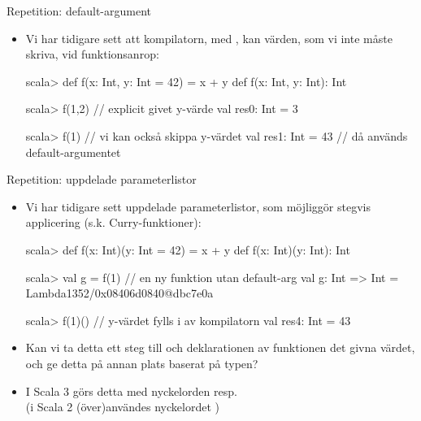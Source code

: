 \begin{Slide}{Repetition: default-argument}\SlideFontSmall
\begin{itemize}\SlideFontSmall
\item Vi har tidigare sett att kompilatorn, med , kan  värden, som vi inte måste skriva, vid funktionsanrop:
\begin{REPLnonum}
scala> def f(x: Int, y: Int = 42) = x + y
def f(x: Int, y: Int): Int

scala> f(1,2)        // explicit givet y-värde
val res0: Int = 3

scala> f(1)          // vi kan också skippa y-värdet  
val res1: Int = 43   // då används default-argumentet
\end{REPLnonum}
\end{itemize}
\end{Slide}


\begin{Slide}{Repetition: uppdelade parameterlistor}\SlideFontSmall
\begin{itemize}\SlideFontSmall
\item Vi har tidigare sett uppdelade parameterlistor, som möjliggör stegvis applicering (s.k. Curry-funktioner):
\begin{REPLsmall}
scala> def f(x: Int)(y: Int = 42) = x + y
def f(x: Int)(y: Int): Int

scala> val g = f(1)  // en ny funktion utan default-arg
val g: Int => Int = Lambda1352/0x08406d0840@dbc7e0a

scala> f(1)()   // y-värdet fylls i av kompilatorn
val res4: Int = 43
\end{REPLsmall}
\pause
\item  Kan vi ta detta ett steg till och  deklarationen av funktionen  det givna värdet, och ge detta på annan plats baserat på typen?
\pause 
\item I Scala 3 görs detta med nyckelorden  resp. \\(i Scala 2 (över)användes nyckelordet )
\end{itemize}
\end{Slide}

